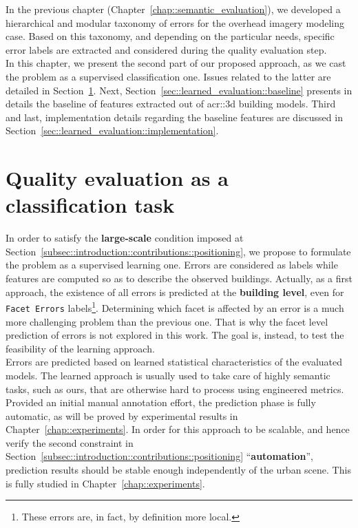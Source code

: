 \minitoc

\vfill

In the previous chapter (Chapter~\ref{chap::semantic_evaluation}), we developed a hierarchical and modular taxonomy of errors for the overhead imagery modeling case.
Based on this taxonomy, and depending on the particular needs, specific error labels are extracted and considered during the quality evaluation step.\\

In this chapter, we present the second part of our proposed approach, as we cast the problem as a supervised classification one.
Issues related to the latter are detailed in Section~\ref{sec::learned_evaluation::classification}.
Next, Section~\ref{sec::learned_evaluation::baseline} presents in details the baseline of features extracted out of \gls{acr::3d} building models.
Third and last, implementation details regarding the baseline features are discussed in Section~\ref{sec::learned_evaluation::implementation}.

\clearpage

\section{Quality evaluation as a classification task}
    \label{sec::learned_evaluation::classification}
    In order to satisfy the \textbf{large-scale} condition imposed at Section~\ref{subsec::introduction::contributions::positioning}, we propose to formulate the problem as a supervised learning one.
    Errors are considered as labels while features are computed so as to describe the observed buildings.
    Actually, as a first approach, the existence of all errors is predicted at the \textbf{building level}, even for \texttt{Facet Errors} labels\footnote{These errors are, in fact, by definition more local.}.
    Determining which facet is affected by an error is a much more challenging problem than the previous one.
    That is why the facet level prediction of errors is not explored in this work.
    The goal is, instead, to test the feasibility of the learning approach.\\

    Errors are predicted based on learned statistical characteristics of the evaluated models.
    The learned approach is usually used to take care of highly semantic tasks, such as ours, that are otherwise hard to process using engineered metrics.\\
    Provided an initial manual annotation effort, the prediction phase is fully automatic, as will be proved by experimental results in Chapter~\ref{chap::experiments}.
    In order for this approach to be scalable, and hence verify the second constraint in Section~\ref{subsec::introduction::contributions::positioning} ``\textbf{automation}'', prediction results should be stable enough independently of the urban scene.
    This is fully studied in Chapter~\ref{chap::experiments}.\\

